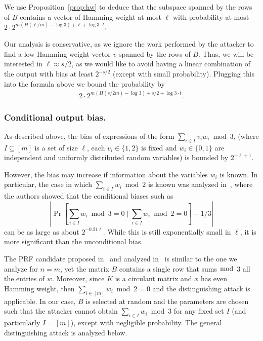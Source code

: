 \documentclass[orivec,envcountsect]{llncs}
\begin{document}
We use Proposition~\ref{prop:hw} to deduce
that the subspace spanned by the rows of $B$ contains a vector of Hamming weight at most $\ell$ with probability at most
$2 \cdot 2^{m (H(\ell/m) - \log 3) + \ell + \log 3 \cdot t}$.

Our analysis is conservative, as we ignore the work performed
by the attacker to find a low Hamming weight vector $v$ spanned by the rows of $B$.
Thus, we will be interested in $\ell \approx s/2$,
as we would like to avoid having a linear combination of the output with bias at least $2^{-s/2}$
(except with small probability).
Plugging this into the formula above we bound the probability by
\begin{align}
\label{eq:bias}
2 \cdot 2^{m (H(s/2m) - \log 3) + s/2 + \log 3 \cdot t}.
\end{align}

\subsubsection{Conditional output bias.}
As described above, the bias of expressions of the form $\sum_{i \in I} v_i w_i \bmod 3$,
(where $I \subseteq [m]$ is a set of size $\ell$, each $v_i \in \{1,2\}$ is fixed and $w_i \in \{0,1\}$
are independent and uniformly distributed random variables) is bounded by $2^{-\ell+1}$.

However, the bias may increase if information about the variables $w_i$ is known.
In particular, the case in which $\sum_{i \in I} w_i \bmod 2$ is known was analyzed in~\cite{CheonCKK20},
where the authors showed that the conditional biases such as
$$\left| \Pr \left[\sum_{i \in I} w_i \bmod 3 = 0 \mid \sum_{i \in I} w_i \bmod 2 = 0 \right] - 1/3 \right|$$
can be as large as about $2^{-0.21\ell}$.
While this is still exponentially small in $\ell$,
it is more significant than the unconditional bias.

The PRF candidate proposed in~\cite{BonehIPSW18} and analyzed in~\cite{CheonCKK20}
is similar to the one we analyze for $n = m$,
yet the matrix $B$ contains a single row that sums $\bmod$ 3 all the entries of $w$.
Moreover, since $K$ is a circulant matrix and $x$ has even Hamming weight,
then $\sum_{i \in [m]} w_i \bmod 2 = 0$ and the distinguishing attack is applicable.
In our case, $B$ is selected at random and the parameters are chosen
such that the attacker cannot obtain $\sum_{i \in I} w_i \bmod 3$ for any fixed set $I$ (and particularly $I = [m]$),
except with negligible probability.
The general distinguishing attack is analyzed below.
\end{document}
